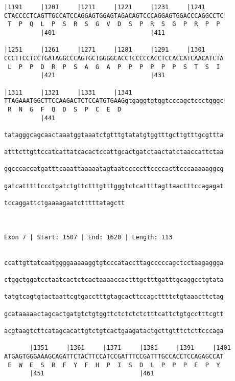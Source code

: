 \documentclass{article}
\begin{document}
\begin{Verbatim}
|1191     |1201     |1211     |1221     |1231     |1241     
CTACCCCTCAGTTGCCATCCAGGAGTGGAGTAGACAGTCCCAGGAGTGGACCCAGGCCTC
 T  P  Q  L  P  S  R  S  G  V  D  S  P  R  S  G  P  R  P  P 
          |401                          |411                
  
|1251     |1261     |1271     |1281     |1291     |1301     
CCCTTCCTCCTGATAGGCCCAGTGCTGGGGCACCTCCCCCACCTCCACCATCAACATCTA
 L  P  P  D  R  P  S  A  G  A  P  P  P  P  P  P  S  T  S  I 
          |421                          |431                
  
|1311     |1321     |1331     |1341                         
TTAGAAATGGCTTCCAAGACTCTCCATGTGAAGgtgaggtgtggtcccagctccctgggc
 R  N  G  F  Q  D  S  P  C  E  D                            
          |441                                              
  
tatagggcagcaactaaatggtaaatctgtttgtatatgtggtttgcttgtttgcgttta
                                                            
atttcttgttccatcattatcacactccattgcactgatctaactatctaaccattctaa
                                                            
ggcccaccatgatttcaaattaaaaatagtaatcccccttccccacttcccaaaaaggcg
                                                            
gatcatttttccctgatctgttctttgtttgggtctcattttagttaactttccagagat
                                                            
tccaggattctgaaaagaatctttttatagctt
                                 
                                 
 
Exon 7 | Start: 1507 | End: 1620 | Length: 113


ccattgttatcaatggggaaaaaggtgtcccataccttagcccccagctcctaagaggga
                                                            
ctggctggatcctaatcactctcactaaaaccactttgctttgatttgcaggcctgtata
                                                            
tatgtcagtgtactaattcgtgacctttgtagcacttccagcttttctgtaaacttctag
                                                            
gcataaaaactagcactgatgtctgtggttctctctctctttcattctgtgcctttcgtt
                                                            
acgtaagtcttcatagcacattgtctgtcactgaagatactgcttgtttctcttcccaga
                                                            
       |1351     |1361     |1371     |1381     |1391     |1401
ATGAGTGGGAAAGCAGATTCTACTTCCATCCGATTTCCGATTTGCCACCTCCAGAGCCAT
 E  W  E  S  R  F  Y  F  H  P  I  S  D  L  P  P  P  E  P  Y 
       |451                          |461                   
  

\end{Verbatim}
\end{document}
